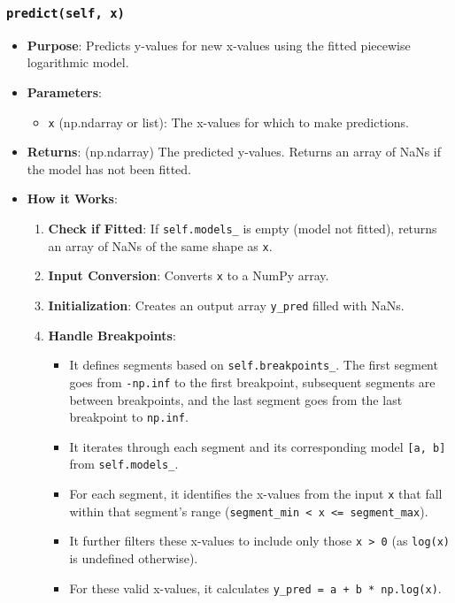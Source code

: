 \documentclass[12pt,a4paper]{report}
\begin{document}
{\subsubsection{\texttt{predict(self, x)}}
\begin{itemize}
    \item \textbf{Purpose}: Predicts y-values for new x-values using the fitted piecewise logarithmic model.
    \item \textbf{Parameters}:
        \begin{itemize}
            \item \texttt{x} (np.ndarray or list): The x-values for which to make predictions.
        \end{itemize}
    \item \textbf{Returns}: (np.ndarray) The predicted y-values. Returns an array of NaNs if the model has not been fitted.
    \item \textbf{How it Works}:
        \begin{enumerate}
            \item \textbf{Check if Fitted}: If \texttt{self.models\_} is empty (model not fitted), returns an array of NaNs of the same shape as \texttt{x}.
            \item \textbf{Input Conversion}: Converts \texttt{x} to a NumPy array.
            \item \textbf{Initialization}: Creates an output array \texttt{y\_pred} filled with NaNs.
            \item \textbf{Handle Breakpoints}:
                \begin{itemize}
                    \item It defines segments based on \texttt{self.breakpoints\_}. The first segment goes from \texttt{-np.inf} to the first breakpoint, subsequent segments are between breakpoints, and the last segment goes from the last breakpoint to \texttt{np.inf}.
                    \item It iterates through each segment and its corresponding model \texttt{[a, b]} from \texttt{self.models\_}.
                    \item For each segment, it identifies the x-values from the input \texttt{x} that fall within that segment's range (\texttt{segment\_min < x <= segment\_max}).
                    \item It further filters these x-values to include only those \texttt{x > 0} (as \texttt{log(x)} is undefined otherwise).
                    \item For these valid x-values, it calculates \texttt{y\_pred = a + b * np.log(x)}.
                \end{itemize}
        \end{enumerate}
\end{itemize}

}
\end{document}
